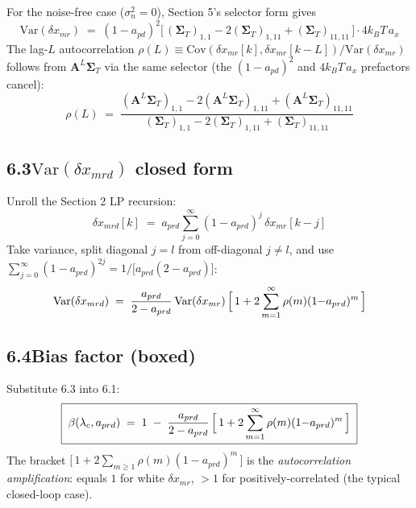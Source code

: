 \documentclass[11pt]{article}
\newcommand{\lc}{\lambda_c}
\newcommand{\kB}{k_B}
\begin{document}
For the noise-free case ($\sigma^{2}_n = 0$), Section 5's selector form gives
\begin{equation}
\mathrm{Var}(\delta x_{mr}) \;=\; (1{-}a_{pd})^{2}\bigl[\,(\bm{\Sigma}_T)_{1,1} - 2(\bm{\Sigma}_T)_{1,11} + (\bm{\Sigma}_T)_{11,11}\,\bigr]\cdot 4\kB T\, a_x
\end{equation}
The lag-$L$ autocorrelation
$\rho(L) \equiv \mathrm{Cov}(\delta x_{mr}[k], \delta x_{mr}[k\!-\!L]) / \mathrm{Var}(\delta x_{mr})$
follows from $\bm{A}^{L}\bm{\Sigma}_T$ via the same selector
(the $(1{-}a_{pd})^{2}$ and $4\kB T\, a_x$ prefactors cancel):
\begin{equation}
\rho(L) \;=\; \frac{(\bm{A}^{L}\bm{\Sigma}_T)_{1,1} - 2(\bm{A}^{L}\bm{\Sigma}_T)_{1,11} + (\bm{A}^{L}\bm{\Sigma}_T)_{11,11}}
                     {(\bm{\Sigma}_T)_{1,1} - 2(\bm{\Sigma}_T)_{1,11} + (\bm{\Sigma}_T)_{11,11}}
\end{equation}

\subsection*{6.3\quad $\mathrm{Var}(\delta x_{mrd})$ closed form}

Unroll the Section 2 LP recursion:
\begin{equation}
\delta x_{mrd}[k] \;=\; a_{prd}\sum_{j=0}^{\infty}(1{-}a_{prd})^{j}\,\delta x_{mr}[k\!-\!j]
\end{equation}
Take variance, split diagonal $j\!=\!l$ from off-diagonal $j\!\neq\!l$, and use
$\sum_{j=0}^{\infty}(1{-}a_{prd})^{2j} = 1/\bigl[a_{prd}(2{-}a_{prd})\bigr]$:
\begin{equation}
\mathrm{Var}(\delta x_{mrd}) \;=\; \frac{a_{prd}}{2 - a_{prd}}\,\mathrm{Var}(\delta x_{mr})\,\Bigl[\,1 + 2\sum_{m=1}^{\infty}\rho(m)(1{-}a_{prd})^{m}\,\Bigr]
\end{equation}

\subsection*{6.4\quad Bias factor (boxed)}

Substitute 6.3 into 6.1:
\begin{equation}
\boxed{\;\beta(\lc, a_{prd}) \;=\; 1 \;-\; \frac{a_{prd}}{2 - a_{prd}}\,\Bigl[\,1 + 2\sum_{m=1}^{\infty}\rho(m)(1{-}a_{prd})^{m}\,\Bigr]\;}
\end{equation}
The bracket $\bigl[\,1 + 2\sum_{m\geq 1}\rho(m)(1{-}a_{prd})^{m}\,\bigr]$ is the
\emph{autocorrelation amplification}: equals $1$ for white $\delta x_{mr}$,
$>\!1$ for positively-correlated (the typical closed-loop case).
\end{document}
